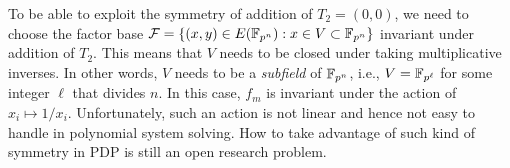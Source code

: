 To be able to exploit the symmetry of addition of $T_2=(0,0)$, we need
to choose the factor base
$\mathcal F=\{(x,y)\in E(\mathbb F_{p^n}):x\in V\subset\mathbb F_{p^n}\}$ invariant
under addition of $T_2$.
%
This means that $V$ needs to be closed under taking multiplicative
inverses.
%
In other words, $V$ needs to be a \emph{subfield} of $\mathbb F_{p^n}$, i.e.,
$V=\mathbb F_{p^\ell}$ for some integer $\ell$ that divides $n$.
%
In this case, $f_m$ is invariant under the action of
$x_i\mapsto 1/x_i$.
%
Unfortunately, such an action is not linear and hence not easy to
handle in polynomial system solving.
%
How to take advantage of such kind of symmetry in PDP is still an open
research problem.

